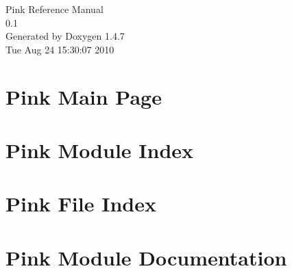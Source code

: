 \documentclass[a4paper]{book}
\begin{document}
\begin{titlepage}
\vspace*{7cm}
\begin{center}
{\Large Pink Reference Manual\\[1ex]\large 0.1 }\\
\vspace*{1cm}
{\large Generated by Doxygen 1.4.7}\\
\vspace*{0.5cm}
{\small Tue Aug 24 15:30:07 2010}\\
\end{center}
\end{titlepage}
\clearemptydoublepage
{}
\tableofcontents
\clearemptydoublepage
{}
\chapter{Pink Main Page}
\label{index}
\chapter{Pink Module Index}

\chapter{Pink File Index}

\chapter{Pink Module Documentation}














\end{document}
